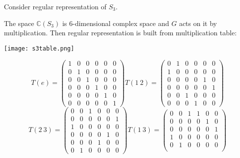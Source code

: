 \documentclass{amsart}
\begin{document}
\begin{example}
    Consider regular representation of $S_3$. 
\end{example}

The space $\mathbb{C} (S_3)$ is 6-dimensional complex space and $G$ acts on it by multiplication. Then regular representation is built from multiplication table:

{
\center
\texttt{[image: s3table.png]}

\begin{equation*}
    T (e) = \begin{pmatrix}
        1 & 0 & 0 & 0 & 0 & 0\\ 
        0 & 1 & 0 & 0 & 0 & 0\\
        0 & 0 & 1 & 0 & 0 & 0\\
        0 & 0 & 0 & 1 & 0 & 0\\
        0 & 0 & 0 & 0 & 1 & 0\\
        0 & 0 & 0 & 0 & 0 & 1
    \end{pmatrix}
    T (1\ 2) = \begin{pmatrix}
        0 & 1 & 0 & 0 & 0 & 0\\ 
        1 & 0 & 0 & 0 & 0 & 0\\
        0 & 0 & 0 & 0 & 1 & 0\\
        0 & 0 & 0 & 0 & 0 & 1\\
        0 & 0 & 1 & 0 & 0 & 0\\
        0 & 0 & 0 & 1 & 0 & 0
    \end{pmatrix}
\end{equation*}
\begin{equation*}
    T (2\ 3) = \begin{pmatrix}
        0 & 0 & 1 & 0 & 0 & 0\\ 
        0 & 0 & 0 & 0 & 0 & 1\\
        1 & 0 & 0 & 0 & 0 & 0\\
        0 & 0 & 0 & 0 & 1 & 0\\
        0 & 0 & 0 & 1 & 0 & 0\\
        0 & 1 & 0 & 0 & 0 & 0
    \end{pmatrix}
    T (1\ 3) = \begin{pmatrix}
        0 & 0 & 1 & 1 & 0 & 0\\ 
        0 & 0 & 0 & 0 & 1 & 0\\
        0 & 0 & 0 & 0 & 0 & 1\\
        1 & 0 & 0 & 0 & 0 & 0\\
        0 & 1 & 0 & 0 & 0 & 0\\

\end{pmatrix}
\end{equation*}}
\end{document}
